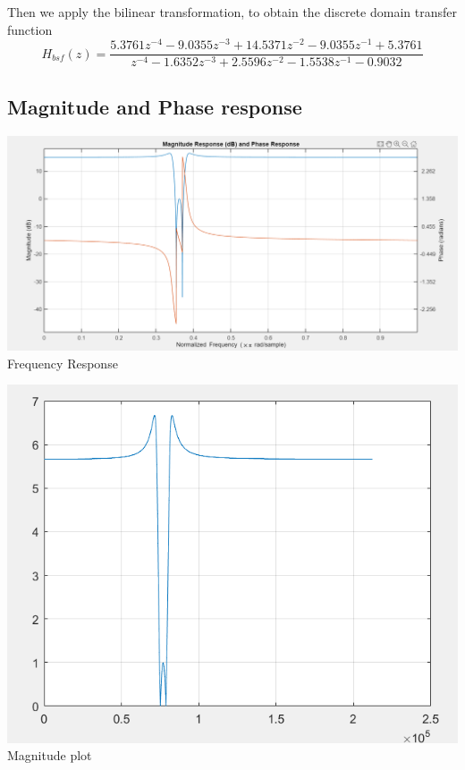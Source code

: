 \documentclass{article}
\begin{document}
Then we apply the bilinear transformation, to obtain the discrete domain transfer function
\begin{equation}
    H_{bsf}(z) = \frac{5.3761z^{-4}-9.0355z^{-3}+14.5371z^{-2}-9.0355z^{-1}+5.3761}{z^{-4}-1.6352z^{-3}+2.5596z^{-2}-1.5538z^{-1}-0.9032}
\end{equation}

\subsection{Magnitude and Phase response}

\begin{center}
    \includegraphics[scale=0.45]{freq_bandstop_ellip.png}\\
    Frequency Response
\end{center}

\begin{center}
    \includegraphics[scale=0.75]{mag_bandstop_ellip.png}\\
    Magnitude plot
\end{center}
\end{document}
